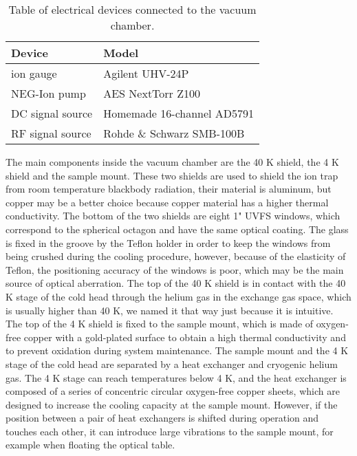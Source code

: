 \begin{table}
    \centering
    \caption{Table of electrical devices connected to the vacuum chamber.}
    \begin{tabular}{ll}
        \toprule
        Device           & Model                      \\
        \midrule
        ion gauge        & Agilent UHV-24P            \\
        NEG-Ion pump     & AES NextTorr Z100          \\
        DC signal source & Homemade 16-channel AD5791 \\
        RF signal source & Rohde \& Schwarz SMB-100B  \\
        \bottomrule
    \end{tabular}
\end{table}

The main components inside the vacuum chamber are the 40 K shield, the 4 K shield and the sample mount. These two shields are used to shield the ion trap from room temperature blackbody radiation, their material is aluminum, but copper may be a better choice because copper material has a higher thermal conductivity. The bottom of the two shields are eight 1" UVFS windows, which correspond to the spherical octagon and have the same optical coating. The glass is fixed in the groove by the Teflon holder in order to keep the windows from being crushed during the cooling procedure, however, because of the elasticity of Teflon, the positioning accuracy of the windows is poor, which may be the main source of optical aberration. The top of the 40 K shield is in contact with the 40 K stage of the cold head through the helium gas in the exchange gas space, which is usually higher than 40 K, we named it that way just because it is intuitive. The top of the 4 K shield is fixed to the sample mount, which is made of oxygen-free copper with a gold-plated surface to obtain a high thermal conductivity and to prevent oxidation during system maintenance. The sample mount and the 4 K stage of the cold head are separated by a heat exchanger and cryogenic helium gas. The 4 K stage can reach temperatures below 4 K, and the heat exchanger is composed of a series of concentric circular oxygen-free copper sheets, which are designed to increase the cooling capacity at the sample mount. However, if the position between a pair of heat exchangers is shifted during operation and touches each other, it can introduce large vibrations to the sample mount, for example when floating the optical table.

